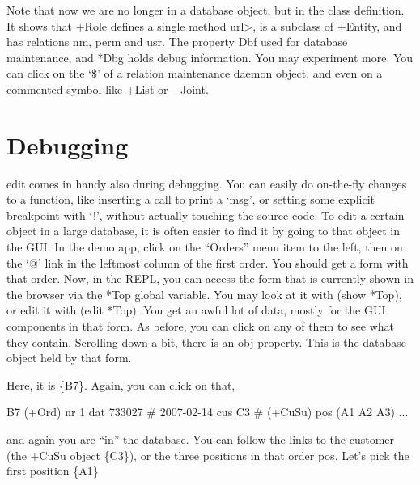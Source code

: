 Note that now we are no longer in a database object, but in the class
definition. It shows that +Role defines a single method url>, is a
subclass of +Entity, and has relations nm, perm and usr. The property
Dbf used for database maintenance, and *Dbg holds debug information.
 You may experiment more. You can click on the `\$' of a relation
maintenance daemon object, and even on a commented symbol like +List or
+Joint.

\section{Debugging}
\label{sec:edit-debugging}


edit comes in handy also during debugging.
 You can easily do on-the-fly changes to a function, like inserting a
call to print a `\href{http://software-lab.de/doc/refM.html#msg}{msg}', or
setting some explicit breakpoint with
`\href{http://software-lab.de/doc/ref_.html#!}{!}', without actually
touching the source code.
 To edit a certain object in a large database, it is often easier to
find it by going to that object in the GUI. In the demo app, click on
the ``Orders'' menu item to the left, then on the `@' link in the leftmost
column of the first order. You should get a form with that order.
 Now, in the REPL, you can access the form that is currently shown in
the browser via the *Top global variable. You may look at it with (show
*Top), or edit it with (edit *Top).
 You get an awful lot of data, mostly for the GUI components in that
form. As before, you can click on any of them to see what they contain.
 Scrolling down a bit, there is an obj property. This is the database
object held by that form.



Here, it is \{B7\}. Again, you can click on that,


\begin{wideverbatim}
{B7} (+Ord)
   nr 1
   dat 733027  # 2007-02-14
   cus {C3}  # (+CuSu)
   pos ({A1} {A2} {A3})
...
\end{wideverbatim}

and again you are ``in'' the database. You can follow the links to the
customer (the +CuSu object \{C3\}), or the three positions in that order
pos.
 Let's pick the first position \{A1\}



